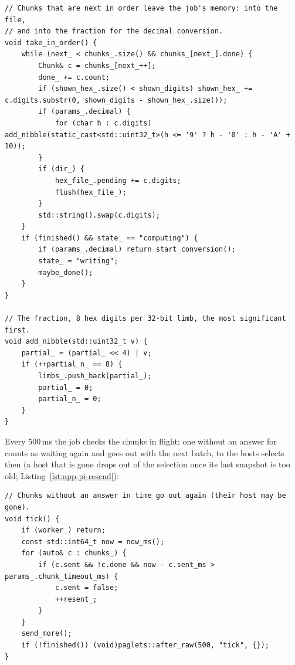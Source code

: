 \begin{lstlisting}[style=paglets-cpp,caption={Pi: chunks leave the job's memory in order \src{cpp/examples/pi/pi.cpp}},label={lst:app-pi-in-order}]
// Chunks that are next in order leave the job's memory: into the file,
// and into the fraction for the decimal conversion.
void take_in_order() {
    while (next_ < chunks_.size() && chunks_[next_].done) {
        Chunk& c = chunks_[next_++];
        done_ += c.count;
        if (shown_hex_.size() < shown_digits) shown_hex_ += c.digits.substr(0, shown_digits - shown_hex_.size());
        if (params_.decimal) {
            for (char h : c.digits) add_nibble(static_cast<std::uint32_t>(h <= '9' ? h - '0' : h - 'A' + 10));
        }
        if (dir_) {
            hex_file_.pending += c.digits;
            flush(hex_file_);
        }
        std::string().swap(c.digits);
    }
    if (finished() && state_ == "computing") {
        if (params_.decimal) return start_conversion();
        state_ = "writing";
        maybe_done();
    }
}

// The fraction, 8 hex digits per 32-bit limb, the most significant first.
void add_nibble(std::uint32_t v) {
    partial_ = (partial_ << 4) | v;
    if (++partial_n_ == 8) {
        limbs_.push_back(partial_);
        partial_ = 0;
        partial_n_ = 0;
    }
}
\end{lstlisting}

Every 500\,ms the job checks the chunks in flight; one without an answer
for  counts as waiting again and goes out with
the next batch, to the hosts  selects then (a host that is
gone drops out of the selection once its last snapshot is too old;
Listing~\ref{lst:app-pi-resend}):

\begin{lstlisting}[style=paglets-cpp,caption={Pi: chunks without an answer go out again \src{cpp/examples/pi/pi.cpp}},label={lst:app-pi-resend}]
// Chunks without an answer in time go out again (their host may be gone).
void tick() {
    if (worker_) return;
    const std::int64_t now = now_ms();
    for (auto& c : chunks_) {
        if (c.sent && !c.done && now - c.sent_ms > params_.chunk_timeout_ms) {
            c.sent = false;
            ++resent_;
        }
    }
    send_more();
    if (!finished()) (void)paglets::after_raw(500, "tick", {});
}
\end{lstlisting}


